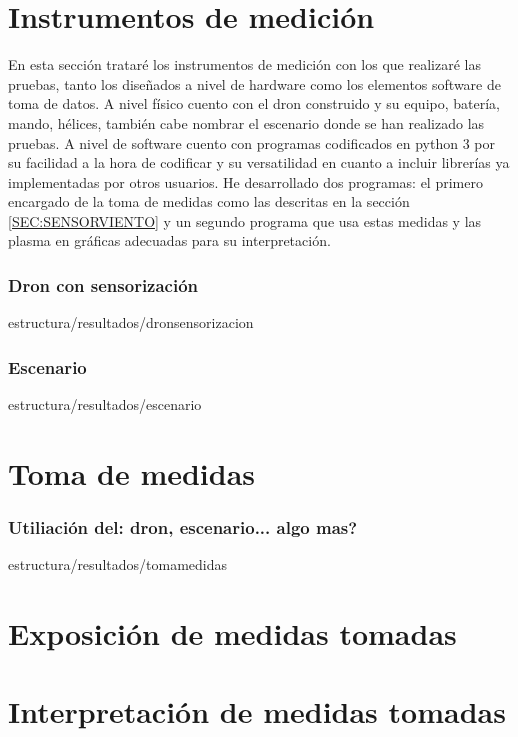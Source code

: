 
\section{Instrumentos de medición\label{SEC:INSTR}}
	En esta sección trataré los instrumentos de medición con los que realizaré las pruebas, tanto los diseñados a nivel de hardware como los elementos software de toma de datos. 
	A nivel físico cuento con el dron construido y su equipo, batería, mando, hélices, también cabe nombrar el escenario donde se han realizado las pruebas. A nivel de software cuento con programas codificados en python 3 por su facilidad a la hora de codificar y su versatilidad en cuanto a incluir librerías ya implementadas por otros usuarios. He desarrollado dos programas: el primero encargado de la toma de medidas como las descritas en la sección \ref{SEC:SENSORVIENTO} y un segundo programa que usa estas medidas y las plasma en gráficas adecuadas para su interpretación.
	
	\subsubsection{Dron con sensorización\label{SS:DRONSENS}}{estructura/resultados/dronsensorizacion}
	\subsubsection{Escenario\label{SS:ESCENARIO}}{estructura/resultados/escenario}
\section{Toma de medidas\label{SEC:TOMAMEDIDAS}}
	\subsubsection{Utiliación del: dron, escenario... algo mas?\label{SS:UTIL}}{estructura/resultados/tomamedidas}
\section{Exposición de medidas tomadas\label{SEC:EXPOSICION}}

\section{Interpretación de medidas tomadas\label{SEC:INTR}}
